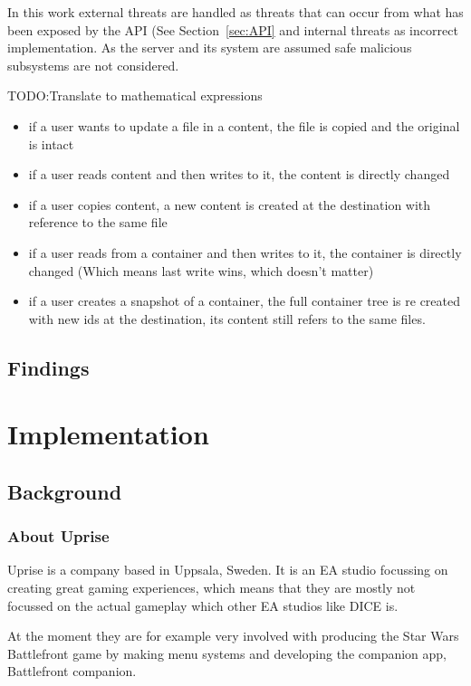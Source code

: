 \documentclass[a4paper,12pt]{article}
\newcommand{\fix}{\colorbox{yellow!30}{TODO:}}
\begin{document}
In this work external threats are handled as threats that can occur from what has been exposed by
the API (See Section~\ref{sec:API} and internal threats as incorrect implementation. As the server
and its system are assumed safe malicious subsystems are not considered.


\fix Translate to mathematical expressions

\begin{itemize}
    \item if a user wants to update a file in a content, the file is copied and the original is intact
    \item if a user reads content and then writes to it, the content is directly changed
    \item if a user copies content, a new content is created at the destination with reference to the same
          file
    \item if a user reads from a container and then writes to it, the container is directly changed
          (Which means last write wins, which doesn't matter)
    \item if a user creates a snapshot of a container, the full container tree is re created with 
          new ids at the destination, its content still refers to the same files.
\end{itemize}

\subsection{Findings}

\newpage
\section{Implementation}
\subsection{Background}
\subsubsection{About Uprise}
Uprise is a company based in Uppsala, Sweden. It is an EA studio focussing on creating great gaming
experiences, which means that they are mostly not focussed on the actual gameplay which other EA 
studios like DICE is. 

At the moment they are for example very involved with producing the Star Wars Battlefront game by
making menu systems and developing the companion app, Battlefront companion.
\end{document}

